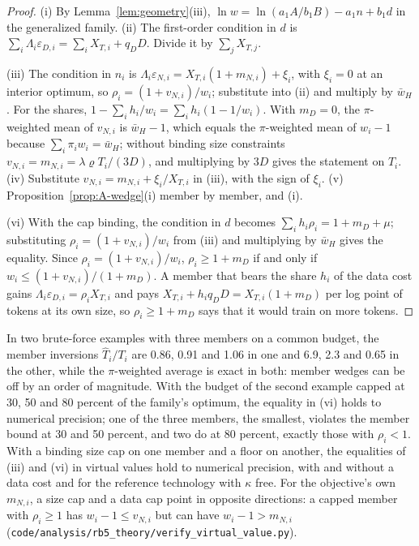 \begin{proof}
(i) By Lemma~\ref{lem:geometry}(iii), $\ln w=\ln(a_1A/b_1B)-a_1n+b_1d$ in the generalized family. (ii) The
first-order condition in $d$ is $\sum_i\Lambda_i\varepsilon_{D,i}=\sum_iX_{T,i}+q_DD$. Divide it by $\sum_jX_{T,j}$.

(iii) The condition in $n_i$ is $\Lambda_i\varepsilon_{N,i}=X_{T,i}(1+m_{N,i})+\xi_i$, with $\xi_i=0$ at an interior
optimum, so $\rho_i=(1+v_{N,i})/w_i$; substitute into (ii) and multiply by $\bar w_H$. For the shares,
$1-\sum_ih_i/w_i=\sum_ih_i(1-1/w_i)$. With $m_D=0$, the $\pi$-weighted mean of $v_{N,i}$ is $\bar w_H-1$, which equals
the $\pi$-weighted mean of $w_i-1$ because $\sum_i\pi_iw_i=\bar w_H$; without binding size constraints
$v_{N,i}=m_{N,i}=\lambda\varrho T_i/(3D)$, and multiplying by $3D$ gives the statement on $\hat T_i$. (iv) Substitute
$v_{N,i}=m_{N,i}+\xi_i/X_{T,i}$ in (iii), with the sign of $\xi_i$. (v) Proposition~\ref{prop:A-wedge}(i) member by
member, and (i).

(vi) With the cap binding, the condition in $d$ becomes $\sum_ih_i\rho_i=1+m_D+\mu$; substituting
$\rho_i=(1+v_{N,i})/w_i$ from (iii) and multiplying by $\bar w_H$ gives the equality. Since $\rho_i=(1+v_{N,i})/w_i$,
$\rho_i\ge1+m_D$ if and only if $w_i\le(1+v_{N,i})/(1+m_D)$. A member that bears the share $h_i$ of the data cost gains
$\Lambda_i\varepsilon_{D,i}=\rho_iX_{T,i}$ and pays $X_{T,i}+h_iq_DD=X_{T,i}(1+m_D)$ per log point of tokens at its own
size, so $\rho_i\ge1+m_D$ says that it would train on more tokens.
\end{proof}

\begin{remark}
In two brute-force examples with three members on a common budget, the member inversions $\hat T_i/T_i$ are 0.86, 0.91
and 1.06 in one and 6.9, 2.3 and 0.65 in the other, while the $\pi$-weighted average is exact in both: member wedges can
be off by an order of magnitude. With the budget of the second example capped at 30, 50 and 80 percent of the family's
optimum, the equality in (vi) holds to numerical precision; one of the three members, the smallest, violates the member
bound at 30 and 50 percent, and two do at 80 percent, exactly those with $\rho_i<1$. With a binding size cap on one member
and a floor on another, the equalities of (iii) and (vi) in virtual values hold to numerical precision, with and without a
data cost and for the reference technology with $\kappa$ free. For the objective's own $m_{N,i}$, a size cap and a data
cap point in opposite directions: a capped member with $\rho_i\ge1$ has $w_i-1\le v_{N,i}$ but can have $w_i-1>m_{N,i}$
(\texttt{code/analysis/rb5\_theory/verify\_virtual\_value.py}).
\end{remark}

